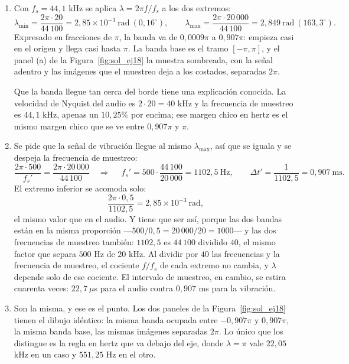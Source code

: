 \documentclass[10pt,a4paper]{article}
\begin{document}
	\begin{enumerate}
		\item Con $f_s = 44{,}1$ kHz se
		aplica $\lambda = 2\pi f/f_s$ a los dos extremos:
		\[
			\lambda_{\min} = \frac{2\pi\cdot 20}{44\,100} = 2{,}85\times10^{-3}\ \text{rad}
			\ (0{,}16^\circ),
			\qquad
			\lambda_{\max} = \frac{2\pi\cdot 20\,000}{44\,100} = 2{,}849\ \text{rad}
			\ (163{,}3^\circ).
		\]
		Expresado en fracciones de $\pi$, la banda va de $0{,}0009\pi$ a $0{,}907\pi$: empieza
		casi en el origen y llega casi hasta $\pi$. La banda base es el tramo $[-\pi,\pi]$, y
		el panel (a) de la Figura~\ref{fig:sol_ej18} la muestra sombreada, con la señal adentro
		y las imágenes que el muestreo deja a los costados, separadas $2\pi$.

		Que la banda llegue tan cerca del borde tiene una explicación conocida. La velocidad de
		Nyquist del audio es $2\cdot 20 = 40$ kHz y la frecuencia de muestreo es $44{,}1$ kHz,
		apenas un $10{,}25\%$ por encima; ese margen chico en hertz es el mismo margen chico
		que se ve entre $0{,}907\pi$ y $\pi$.

		\item Se pide que la señal de vibración
		llegue al mismo $\lambda_{\max}$, así que se iguala y se despeja la frecuencia de
		muestreo:
		\[
			\frac{2\pi\cdot 500}{f_s'} = \frac{2\pi\cdot 20\,000}{44\,100}
			\quad\Longrightarrow\quad
			\boxed{\;f_s' = 500\cdot\frac{44\,100}{20\,000} = 1102{,}5\ \text{Hz},
			\qquad \Delta t' = \frac{1}{1102{,}5} = 0{,}907\ \text{ms}.\;}
		\]
		El extremo inferior se acomoda solo:
		\[
			\frac{2\pi\cdot 0{,}5}{1102{,}5} = 2{,}85\times10^{-3}\ \text{rad},
		\]
		el mismo valor que en el audio. Y tiene que ser así, porque las dos bandas están en la
		misma proporción ---$500/0{,}5 = 20\,000/20 = 1000$--- y las dos frecuencias de
		muestreo también: $1102{,}5$ es $44\,100$ dividido $40$, el mismo factor que separa
		$500$ Hz de $20$ kHz. Al dividir por $40$ las frecuencias y la frecuencia de muestreo,
		el cociente $f/f_s$ de cada extremo no cambia, y $\lambda$ depende solo de ese
		cociente. El intervalo de muestreo, en cambio, se estira cuarenta veces: $22{,}7\
		\mu$s para el audio contra $0{,}907$ ms para la vibración.

		\item Son la misma, y ese es el punto. Los dos
		paneles de la Figura~\ref{fig:sol_ej18} tienen el dibujo idéntico: la misma banda
		ocupada entre $-0{,}907\pi$ y $0{,}907\pi$, la misma banda base, las mismas imágenes
		separadas $2\pi$. Lo único que los distingue es la regla en hertz que va debajo del
		eje, donde $\lambda = \pi$ vale $22{,}05$ kHz en un caso y $551{,}25$ Hz en el otro.


\end{enumerate}
\end{document}

